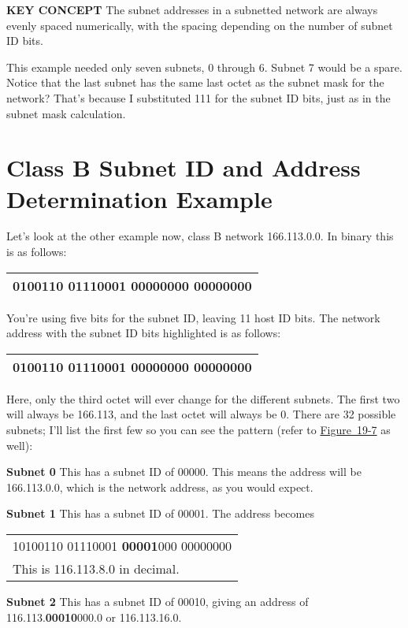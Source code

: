 {\textbf{KEY CONCEPT}} The subnet addresses in a subnetted network are
always evenly spaced numerically, with the spacing depending on the
number of subnet ID bits.

This example needed only seven subnets, 0 through 6. Subnet 7 would be a
spare. Notice that the last subnet has the same last octet as the subnet
mask for the network? That's because I substituted 111 for the subnet ID
bits, just as in the subnet mask calculation.

\section{Class B Subnet ID and Address Determination Example}

Let's look at the other example now, class B network 166.113.0.0. In
binary this is as follows:

\begin{longtable}[]{@{}l@{}}
\toprule
\endhead
0100110 01110001 00000000 00000000\tabularnewline
\bottomrule
\end{longtable}

You're using five bits for the subnet ID, leaving 11 host ID bits. The
network address with the subnet ID bits highlighted is as follows:

\begin{longtable}[]{@{}l@{}}
\toprule
\endhead
0100110 01110001 {\textbf{00000}}000 00000000\tabularnewline
\bottomrule
\end{longtable}

Here, only the third octet will ever change for the different subnets.
The first two will always be 166.113, and the last octet will always be
0. There are 32 possible subnets; I'll list the first few so you can see
the pattern (refer to
\protect\hyperlink{ch19s04.htmlux5cux23determining_subnet_addresses_for_a-id001}{Figure~19-7}
as well):

{\textbf{Subnet 0}} This has a subnet ID of 00000. This means the
address will be 166.113.0.0, which is the network address, as you would
expect.

{\textbf{Subnet 1}} This has a subnet ID of 00001. The address becomes

\begin{longtable}[]{@{}l@{}}
\toprule
\endhead
10100110 01110001 {\textbf{00001}}000 00000000\tabularnewline
This is 116.113.8.0 in decimal.\tabularnewline
\bottomrule
\end{longtable}

{\textbf{Subnet 2}} This has a subnet ID of 00010, giving an address of
116.113.{\textbf{00010}}000.0 or 116.113.16.0.

